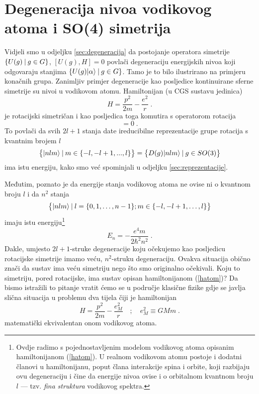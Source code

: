 \section{Degeneracija nivoa vodikovog atoma i SO(4) simetrija}
\label{sec:so4}


Vidjeli smo u odjeljku \ref{sec:degeneracija} da postojanje operatora
simetrije $\{U(g) \: | \: g\in G \}$, $[U(g), H] = 0$ povlači degeneraciju
energijskih nivoa koji odgovaraju stanjima $\{U(g)| \alpha \rangle \: | \: g\in
G \}$. Tamo je to bilo ilustrirano na primjeru konačnih grupa. Zanimljiv
primjer degeneracije kao posljedice kontinuirane sferne simetrije su
nivoi u vodikovom atomu. Hamiltonijan (u CGS sustavu jedinica)
\begin{equation}
    H = \frac{p^2}{2m} - \frac{e^2}{r} \;.
\label{hatom}
\end{equation}
je rotacijski simetričan i kao posljedica toga komutira s operatorom
rotacija
\begin{equation}
     [H, D(\vec{n},\phi)] = 0 \;.
\end{equation}
To povlači da svih $2l+1$ stanja date ireducibilne reprezentacije
grupe rotacija s kvantnim brojem $l$
\begin{equation}
   \big\{| nlm \rangle \: | \: m\in\{-l, -l+1, ..., l \}\big\} = 
   \big\{ D(g)| nlm \rangle \: | \: g \in SO(3) \big\}
\end{equation}
ima istu energiju, kako smo već spominjali u odjeljku \ref{sec:reprezentacije}.

Međutim, poznato je da energije stanja vodikovog atoma ne
ovise ni o kvantnom broju $l$ i da $n^2$ stanja
\begin{equation}
\big\{| nlm \rangle \: | \: l=\{0, 1, \ldots, n-1\}; m\in\{-l, -l+1, \ldots, l \}\big\} 
\end{equation}
imaju istu energiju\footnote{Ovdje radimo s pojednostavljenim modelom vodikovog atoma
opisanim hamiltonijanom (\protect\ref{hatom}). U realnom vodikovom atomu
postoje i dodatni članovi u hamiltonijanu, poput člana interakcije spina
i orbite, koji razbijaju ovu degeneraciju i čine da energije nivoa ovise
i o orbitalnom kvantnom broju $l$ --- tzv. \emph{fina struktura} vodikovog
spektra.}
\begin{equation}
    E_n = - \frac{e^4 m}{2 \hbar^2 n^2}  \;.
\end{equation}
Dakle, umjesto $2l+1$-struke degeneracije koju očekujemo kao posljedicu
rotacijske simetrije imamo veću, $n^2$-struku degeneraciju. Ovakva
situacija obično znači da sustav ima veću simetriju nego što smo
originalno očekivali. Koju to simetriju, pored rotacijske, ima
sustav opisan hamiltonijanom (\ref{hatom})?
Da bismo istražili to pitanje vratit ćemo se u područje klasične
fizike gdje se javlja slična situacija u problemu dva tijela čiji
je hamiltonijan
\begin{equation}
    H = \frac{p^2}{2m} - \frac{e_{M}^2}{r} \quad ; \quad 
 e_{M}^2 \equiv G M m \;.
\end{equation}
matematički ekvivalentan onom vodikovog atoma.

